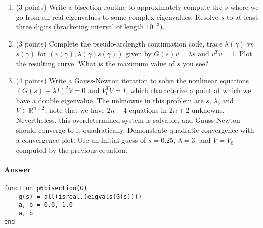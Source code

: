 \documentclass[12pt, leqno]{article} %
\providecommand{\tightlist}{%
  \setlength{\itemsep}{0pt}\setlength{\parskip}{0pt}}
\begin{document}
\begin{enumerate}
\def\labelenumi{\arabic{enumi}.}
\tightlist
\item
  (3 points) Write a bisection routine to approximately compute the
  \(s\) where we go from all real eigenvalues to some complex
  eigenvalues. Resolve \(s\) to at least three digits (bracketing
  interval of length \(10^{-3}\)).
\item
  (3 points) Complete the pseudo-arclength continuation code, trace
  \(\lambda(\gamma)\) vs \(s(\gamma)\) for
  \((v(\gamma), \lambda(\gamma) s(\gamma))\) given by
  \(G(s) v = \lambda s\) and \(v^T v = 1\). Plot the resulting curve.
  What is the maximum value of \(s\) you see?
\item
  (4 points) Write a Gauss-Newton iteration to solve the nonlinear
  equations \((G(s)-\lambda I)^2 V = 0\) and \(V_0^T V = I\), which
  characterize a point at which we have a double eigenvalue. The
  unknowns in this problem are \(s\), \(\lambda\), and
  \(V \in \mathbb{R}^{n \times 2}\); note that we have \(2n+4\)
  equations in \(2n+2\) unknowns. Nevertheless, this overdetermined
  system is solvable, and Gauss-Newton should converge to it
  quadratically. Demonstrate quadratic convergence with a convergence
  plot. Use an initial guess of \(s = 0.25\), \(\lambda = 3\), and
  \(V = V_0\) computed by the previous equation.
\end{enumerate}

\paragraph{Answer}


\begin{verbatim}
function p6bisection(G)
    g(s) = all(isreal.(eigvals(G(s))))
    a, b = 0.0, 1.0
    a, b
end
\end{verbatim}
\end{document}
